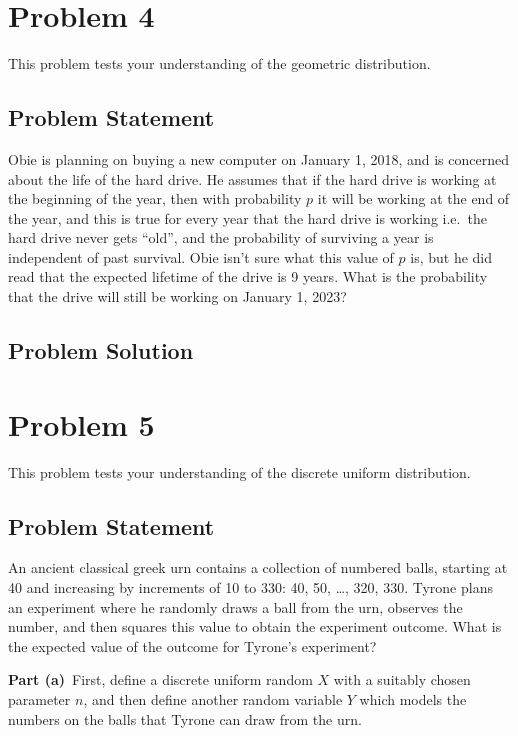 \documentclass[12pt]{article}
\theoremstyle{definition}
\begin{document}
\newpage
\section*{Problem 4}

This problem tests your understanding of the geometric distribution.

\subsection*{Problem Statement}

Obie is planning on buying a new computer on January 1, 2018, and is concerned about the life of the hard drive. He assumes that if the hard drive is working at the beginning of the year, then with probability $p$ it will be working at the end of the year, and this is true for every year that the hard drive is working i.e.\ the hard drive never gets ``old'', and the probability of surviving a year is independent of past survival. Obie isn't sure what this value of $p$ is, but he did read that the expected lifetime of the drive is 9 years. What is the probability that the drive will still be working on January 1, 2023?


\subsection*{Problem Solution}


\newpage
\section*{Problem 5}

This problem tests your understanding of the discrete uniform distribution.

\subsection*{Problem Statement}

An ancient classical greek urn contains a collection of numbered balls, starting at 40 and increasing by increments of 10 to 330: 40, 50, \ldots, 320, 330. Tyrone plans an experiment where he randomly draws a ball from the urn, observes the number, and then squares this value to obtain the experiment outcome. What is the expected value of the outcome for Tyrone's experiment?

\bigskip
\noindent
{\bf Part (a)}\ First, define a discrete uniform random $X$ with a suitably chosen parameter $n$, and then define another random variable $Y$ which models the numbers on the balls that Tyrone can draw from the urn.
\end{document}

